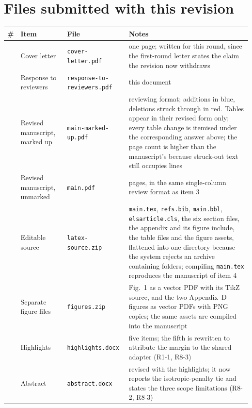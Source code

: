 \section{Files submitted with this revision}

\begin{center}\small
\begin{longtable}{@{}>{\raggedright\arraybackslash}p{0.6cm}>{\raggedright\arraybackslash}p{4.0cm}>{\raggedright\arraybackslash}p{4.4cm}>{\raggedright\arraybackslash}p{4.4cm}@{}}
\toprule
\# & Item & File & Notes \\
\midrule
\endhead
1 & Cover letter & \texttt{cover-letter.pdf} & one page; written for this round, since the
first-round letter states the claim the revision now withdraws \\
\addlinespace
2 & Response to reviewers & \texttt{response-to-\allowbreak reviewers.pdf} & this document \\
\addlinespace
3 & Revised manuscript, marked up & \texttt{main-marked-up.pdf} & reviewing format; additions in
blue, deletions struck through in red. Tables appear in their revised form only; every table
change is itemised under the corresponding answer above; the page count is higher than the
manuscript's because struck-out text still occupies lines \\
\addlinespace
4 & Revised manuscript, unmarked & \texttt{main.pdf} & 101 pages, in the same single-column
review format as item 3 \\
\addlinespace
5 & Editable source & \texttt{latex-source.zip} & \texttt{main.tex}, \texttt{refs.bib},
\texttt{main.bbl}, \texttt{elsarticle.cls}, the six section files, the appendix and its
figure include, the table files and the figure assets, flattened into one directory because
the system rejects an archive containing folders; compiling \texttt{main.tex} reproduces the
manuscript of item 4 \\
\addlinespace
6 & Separate figure files & \texttt{figures.zip} & Fig.~1 as a vector PDF with its TikZ source,
and the two Appendix~D figures as vector PDFs with PNG copies; the same assets are compiled
into the manuscript \\
\addlinespace
7 & Highlights & \texttt{highlights.docx} & five items; the fifth is rewritten to attribute the
margin to the shared adapter (R1-1, R8-3) \\
\addlinespace
8 & Abstract & \texttt{abstract.docx} & revised with the highlights; it now reports the
isotropic-penalty tie and states the three scope limitations (R8-2, R8-3) \\

\end{longtable}
\end{center}
